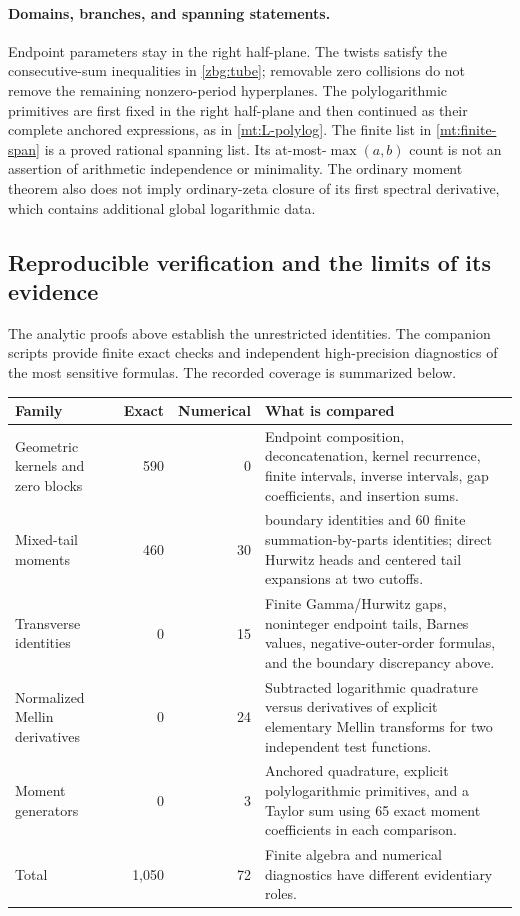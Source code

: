 \documentclass[11pt,letterpaper]{article}
\numberwithin{equation}{section}
\theoremstyle{plain}
\theoremstyle{definition}
\theoremstyle{remark}
\begin{document}
\paragraph{Domains, branches, and spanning statements.}
Endpoint parameters stay in the right half-plane.  The twists satisfy
the consecutive-sum inequalities in \eqref{zbg:tube}; removable zero
collisions do not remove the remaining nonzero-period hyperplanes.
The polylogarithmic primitives are first fixed in the right half-plane
and then continued as their complete anchored expressions, as in
\eqref{mt:L-polylog}.  The finite list in \eqref{mt:finite-span} is
a proved rational spanning list.  Its at-most-$\max(a,b)$ count is not
an assertion of arithmetic independence or minimality.  The ordinary
moment theorem also does not imply ordinary-zeta closure of its first
spectral derivative, which contains additional global logarithmic data.

\subsection{Reproducible verification and the limits of its evidence}

The analytic proofs above establish the unrestricted identities.
The companion scripts provide finite exact checks and independent
high-precision diagnostics of the most sensitive formulas.  The
recorded coverage is summarized below.

\begin{center}
\small
\begin{tabular}{@{}>{\raggedright\arraybackslash}p{1.40in}rr>{\raggedright\arraybackslash}p{3.43in}@{}}
\toprule
Family & Exact & Numerical & What is compared\\
\midrule
Geometric kernels and zero blocks
 & 590 & 0
 & Endpoint composition, deconcatenation, kernel recurrence, finite
   intervals, inverse intervals, gap coefficients, and insertion sums.\\[4pt]
Mixed-tail moments
 & 460 & 30
 & 400 boundary identities and 60 finite summation-by-parts identities;
   direct Hurwitz heads and centered tail expansions at two cutoffs.\\[4pt]
Transverse identities
 & 0 & 15
 & Finite Gamma/Hurwitz gaps, noninteger endpoint tails, Barnes values,
   negative-outer-order formulas, and the boundary discrepancy above.\\[4pt]
Normalized Mellin derivatives
 & 0 & 24
 & Subtracted logarithmic quadrature versus derivatives of explicit
   elementary Mellin transforms for two independent test functions.\\[4pt]
Moment generators
 & 0 & 3
 & Anchored quadrature, explicit polylogarithmic primitives, and a Taylor
   sum using 65 exact moment coefficients in each comparison.\\[4pt]
\midrule
Total & 1,050 & 72 & Finite algebra and numerical diagnostics have
                         different evidentiary roles.\\
\bottomrule
\end{tabular}
\end{center}
\end{document}
